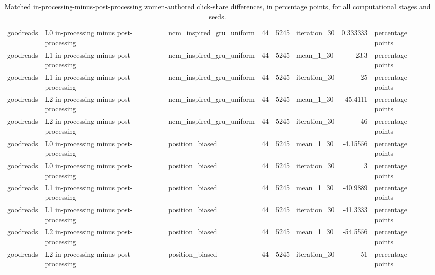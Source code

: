 \begin{table}[htbp!]
\begin{tabular}{lllrrlrl}
goodreads & L0 in-processing minus post-processing & ncm\_inspired\_gru\_uniform & 44 & 5245 & iteration\_30 & 0.333333 & percentage points \\
goodreads & L1 in-processing minus post-processing & ncm\_inspired\_gru\_uniform & 44 & 5245 & mean\_1\_30 & -23.3 & percentage points \\
goodreads & L1 in-processing minus post-processing & ncm\_inspired\_gru\_uniform & 44 & 5245 & iteration\_30 & -25 & percentage points \\
goodreads & L2 in-processing minus post-processing & ncm\_inspired\_gru\_uniform & 44 & 5245 & mean\_1\_30 & -45.4111 & percentage points \\
goodreads & L2 in-processing minus post-processing & ncm\_inspired\_gru\_uniform & 44 & 5245 & iteration\_30 & -46 & percentage points \\
goodreads & L0 in-processing minus post-processing & position\_biased & 44 & 5245 & mean\_1\_30 & -4.15556 & percentage points \\
goodreads & L0 in-processing minus post-processing & position\_biased & 44 & 5245 & iteration\_30 & 3 & percentage points \\
goodreads & L1 in-processing minus post-processing & position\_biased & 44 & 5245 & mean\_1\_30 & -40.9889 & percentage points \\
goodreads & L1 in-processing minus post-processing & position\_biased & 44 & 5245 & iteration\_30 & -41.3333 & percentage points \\
goodreads & L2 in-processing minus post-processing & position\_biased & 44 & 5245 & mean\_1\_30 & -54.5556 & percentage points \\
goodreads & L2 in-processing minus post-processing & position\_biased & 44 & 5245 & iteration\_30 & -51 & percentage points \\
\hline
\end{tabular}
\caption{Matched in-processing-minus-post-processing women-authored click-share differences, in percentage points, for all computational stages and seeds.}
\label{chap:results:tab:rq7_gender_in_versus_post_processing_table}
\end{table}
